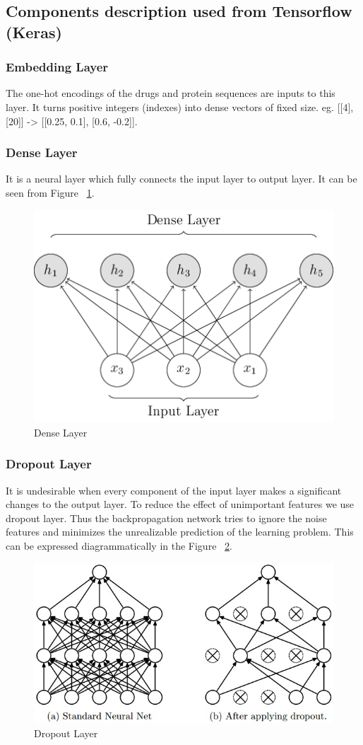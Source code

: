\subsection{Components description used from Tensorflow (Keras)}
\subsubsection{Embedding Layer}
The one-hot encodings of the drugs and protein sequences are inputs to this layer. It turns positive integers (indexes) into dense vectors of fixed size. eg. [[4], [20]] -> [[0.25, 0.1], [0.6, -0.2]].

\subsubsection{Dense Layer}
It is a neural layer which fully connects the input layer to output layer. It can be seen from Figure ~\ref{fig:dense}.
\begin{figure}[ht]
  \centering
  \includegraphics[width=.5\linewidth]{mainmatter/3-Methodology/images/dense.png}
  \caption{Dense Layer}
  \label{fig:dense}
\end{figure}

\subsubsection{Dropout Layer}
It is undesirable when every component of the input layer makes a significant changes to the output layer. To reduce the effect of unimportant features we use dropout layer. Thus the backpropagation network tries to ignore the noise features and minimizes the unrealizable prediction of the learning problem. This can be expressed diagrammatically in the Figure ~\ref{fig:dropout}.
\begin{figure}
  [ht] \centering
  \includegraphics[width=.5\linewidth]{mainmatter/3-Methodology/images/dropout.jpeg}
  \caption{Dropout Layer}
  \label{fig:dropout}

\end{figure}

